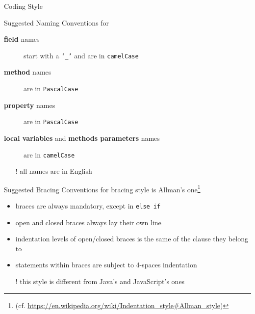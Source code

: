 \documentclass[presentation]{beamer}
\begin{document}
\begin{frame}[allowframebreaks]{\csharp Coding Style}
\begin{exampleblock}{Suggested Naming Conventions for \csharp}
\begin{description}
            \item[\textbf{field} names] start with a \texttt{`\_'} and are in \texttt{camelCase} 
            
            \item[\textbf{method} names] are in \texttt{PascalCase} 
            
            \item[\textbf{property} names] are in \texttt{PascalCase} 
            
            \item[\textbf{local variables} and \textbf{methods parameters} names] are in \texttt{camelCase} 
            
        \end{description}
        \begin{itemize}
            \item[!] all names are \alert{in English}
        \end{itemize}
    \end{exampleblock}

    \framebreak

    \begin{exampleblock}{Suggested Bracing Conventions for \csharp}
        \csharp bracing style is \alert{Allman's} one\footnote{\tiny(cf. \url{https://en.wikipedia.org/wiki/Indentation_style\#Allman_style})}
        \begin{itemize}
            \item braces are always mandatory, except in \alert{\texttt{else if}} 
            \item open and closed braces always lay their own line
            \item indentation levels of open/closed braces is the same of the clause they belong to
            \item statements within braces are subject to 4-spaces indentation
            \item[!] this style is different from Java's and JavaScript's ones
        \end{itemize}
    \end{exampleblock}


\end{frame}
\end{document}

